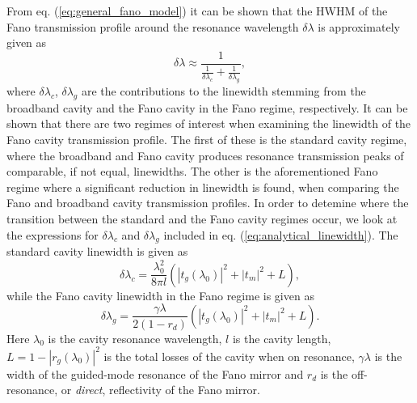 From eq. (\ref{eq:general_fano_model}) it can be shown that the HWHM of the Fano transmission profile around the resonance wavelength $\delta \lambda$ is approximately given as
\begin{equation}
    \delta \lambda \approx \frac{1}{\frac{1}{\delta \lambda_c} + \frac{1}{\delta \lambda_g}},
    \label{eq:analytical_linewidth}
\end{equation}
where $\delta \lambda_c$, $\delta \lambda_g$ are the contributions to the linewidth stemming from the broadband cavity and the Fano cavity in the Fano regime, respectively. It can be shown that there are two regimes of interest when examining the linewidth of the Fano cavity transmission profile. The first of these is the standard cavity regime, where the broadband and Fano cavity produces resonance transmission peaks of comparable, if not equal, linewidths. The other is the aforementioned Fano regime where a significant reduction in linewidth is found, when comparing the Fano and broadband cavity transmission profiles. In order to detemine where the transition between the standard and the Fano cavity regimes occur, we look at the expressions for $\delta \lambda_c$ and $\delta \lambda_g$ included in eq. (\ref{eq:analytical_linewidth}). The standard cavity linewidth is given as
\begin{equation}
    \delta \lambda_c = \frac{\lambda_0^2}{8 \pi l} (|t_g(\lambda_0)|^2 + |t_m|^2 + L),
\end{equation}
while the Fano cavity linewidth in the Fano regime is given as
\begin{equation}
    \delta \lambda_g = \frac{\gamma \lambda}{2 (1-r_d)}(|t_g(\lambda_0)|^2 + |t_m|^2 + L).
\end{equation}
Here $\lambda_0$ is the cavity resonance wavelength, $l$ is the cavity length, $L = 1 - |r_g(\lambda_0)|^2$ is the total losses of the cavity when on resonance, $\gamma \lambda$ is the width of the guided-mode resonance of the Fano mirror and $r_d$ is the off-resonance, or \emph{direct}, reflectivity of the Fano mirror.

